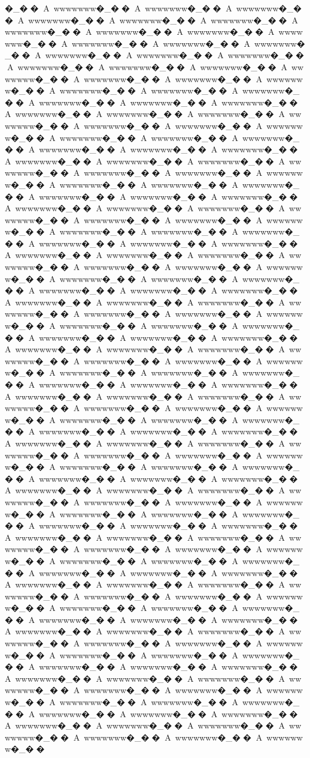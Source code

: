 {{{{{{{{{{{{{{{{{{{{{{{{{{{{{{{{{{{{{{{{{{{{{{{{{�_��A~wwwwwww�_��A~wwwwwww�_��A~wwwwwww�_��A~wwwwwww�_��A~wwwwwww�_��A~wwwwwww�_��A~wwwwwww�_��A~wwwwwww�_��A~wwwwwww�_��A~wwwwwww�_��A~wwwwwww�_��A~wwwwwww�_��A~wwwwwww�_��A~wwwwwww�_��A~wwwwwww�_��A~wwwwwww�_��A~wwwwwww�_��A~wwwwwww�_��A~wwwwwww�_��A~wwwwwww�_��A~wwwwwww�_��A~wwwwwww�_��A~wwwwwww�_��A~wwwwwww�_��A~wwwwwww�_��A~wwwwwww�_��A~wwwwwww�_��A~wwwwwww�_��A~wwwwwww�_��A~wwwwwww�_��A~wwwwwww�_��A~wwwwwww�_��A~wwwwwww�_��A~wwwwwww�_��A~wwwwwww�_��A~wwwwwww�_��A~wwwwwww�_��A~wwwwwww�_��A~wwwwwww�_��A~wwwwwww�_��A~wwwwwww�_��A~wwwwwww�_��A~wwwwwww�_��A~wwwwwww�_��A~wwwwwww�_��A~wwwwwww�_��A~wwwwwww�_��A~wwwwwww�_��A~wwwwwww�_��A~wwwwwww�_��A~wwwwwww�_��A~wwwwwww�_��A~wwwwwww�_��A~wwwwwww�_��A~wwwwwww�_��A~wwwwwww�_��A~wwwwwww�_��A~wwwwwww�_��A~wwwwwww�_��A~wwwwwww�_��A~wwwwwww�_��A~wwwwwww�_��A~wwwwwww�_��A~wwwwwww�_��A~wwwwwww�_��A~wwwwwww�_��A~wwwwwww�_��A~wwwwwww�_��A~wwwwwww�_��A~wwwwwww�_��A~wwwwwww�_��A~wwwwwww�_��A~wwwwwww�_��A~wwwwwww�_��A~wwwwwww�_��A~wwwwwww�_��A~wwwwwww�_��A~wwwwwww�_��A~wwwwwww�_��A~wwwwwww�_��A~wwwwwww�_��A~wwwwwww�_��A~wwwwwww�_��A~wwwwwww�_��A~wwwwwww�_��A~wwwwwww�_��A~wwwwwww�_��A~wwwwwww�_��A~wwwwwww�_��A~wwwwwww�_��A~wwwwwww�_��A~wwwwwww�_��A~wwwwwww�_��A~wwwwwww�_��A~wwwwwww�_��A~wwwwwww�_��A~wwwwwww�_��A~wwwwwww�_��A~wwwwwww�_��A~wwwwwww�_��A~wwwwwww�_��A~wwwwwww�_��A~wwwwwww�_��A~wwwwwww�_��A~wwwwwww�_��A~wwwwwww�_��A~wwwwwww�_��A~wwwwwww�_��A~wwwwwww�_��A~wwwwwww�_��A~wwwwwww�_��A~wwwwwww�_��A~wwwwwww�_��A~wwwwwww�_��A~wwwwwww�_��A~wwwwwww�_��A~wwwwwww�_��A~wwwwwww�_��A~wwwwwww�_��A~wwwwwww�_��A~wwwwwww�_��A~wwwwwww�_��A~wwwwwww�_��A~wwwwwww�_��A~wwwwwww�_��A~wwwwwww�_��A~wwwwwww�_��A~wwwwwww�_��A~wwwwwww�_��A~wwwwwww�_��A~wwwwwww�_��A~wwwwwww�_��A~wwwwwww�_��A~wwwwwww�_��A~wwwwwww�_��A~wwwwwww�_��A~wwwwwww�_��A~wwwwwww�_��A~wwwwwww�_��A~wwwwwww�_��A~wwwwwww�_��A~wwwwwww�_��A~wwwwwww�_��A~wwwwwww�_��A~wwwwwww�_��A~wwwwwww�_��A~wwwwwww�_��A~wwwwwww�_��A~wwwwwww�_��A~wwwwwww�_��A~wwwwwww�_��A~wwwwwww�_��A~wwwwwww�_��A~wwwwwww�_��A~wwwwwww�_��A~wwwwwww�_��A~wwwwwww�_��A~wwwwwww�_��A~wwwwwww�_��A~wwwwwww�_��A~wwwwwww�_��A~wwwwwww�_��A~wwwwwww�_��A~wwwwwww�_��A~wwwwwww�_��A~wwwwwww�_��A~wwwwwww�_��A~wwwwwww�_��A~wwwwwww�_��A~wwwwwww�_��A~wwwwwww�_��A~wwwwwww�_��A~wwwwwww�_��A~wwwwwww�_��A~wwwwwww�_��A~wwwwwww�_��A~wwwwwww�_��A~wwwwwww�_��A~wwwwwww�_��A~wwwwwww�_��A~wwwwwww�_��A~wwwwwww�_��A~wwwwwww�_��A~wwwwwww�_��A~wwwwwww�_��A~wwwwwww�_��A~wwwwwww�_��A~wwwwwww�_��A~wwwwwww�_��A~wwwwwww�_��A~wwwwwww�_��A~wwwwwww�_��A~wwwwwww�_��A~wwwwwww�_��A~wwwwwww�_��A~wwwwwww�_��A~wwwwwww�_��A~wwwwwww�_��A~wwwwwww�_��A~wwwwwww�_��A~wwwwwww�_��A~wwwwwww�_��A~wwwwwww�_��A~wwwwwww�_��A~wwwwwww�_��}}}}}}}}}}}}}}}}}}}}}}}}}}}}}}}}}}}}}}}}}}}}}}}}}
